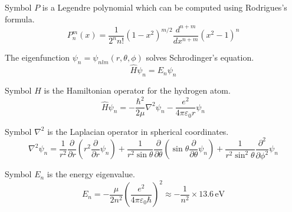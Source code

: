 \documentclass[12pt]{article}
\begin{document}
\noindent
Symbol $P$ is a Legendre polynomial which can be computed using Rodrigues's formula.
\begin{equation*}
P_n^m(x)=\frac{1}{2^n n!}(1-x^2)^{m/2}
\frac{d^{n+m}}{dx^{n+m}}(x^2-1)^n
\end{equation*}

\noindent
The eigenfunction $\psi_n=\psi_{nlm}(r,\theta,\phi)$ solves Schrodinger's equation.
\begin{equation*}
\hat{H}\psi_n=E_n\psi_n
\end{equation*}

\noindent
Symbol $\hat{H}$ is the Hamiltonian operator for the hydrogen atom.
\begin{equation*}
\hat{H}\psi_n=-\frac{\hbar^2}{2\mu}\nabla^2\psi_n-\frac{e^2}{4\pi\varepsilon_0 r}\psi_n
\end{equation*}

\noindent
Symbol $\nabla^2$ is the Laplacian operator in spherical coordinates.
\begin{equation*}
\nabla^2\psi_n=\frac{1}{r^2}\frac{\partial}{\partial r}
\left(r^2\frac{\partial}{\partial r}\psi_n\right)
+
\frac{1}{r^2\sin\theta}\frac{\partial}{\partial\theta}
\left(\sin\theta\frac{\partial}{\partial\theta}\psi_n\right)
+
\frac{1}{r^2\sin^2\theta}\frac{\partial^2}{\partial\phi^2}\psi_n
\end{equation*}

\noindent
Symbol $E_n$ is the energy eigenvalue.
\begin{equation*}
E_n=-\frac{\mu}{2n^2}\left(\frac{e^2}{4\pi\varepsilon_0\hbar}\right)^2
\approx-\frac{1}{n^2}\times13.6\,\text{eV}
\end{equation*}
\end{document}
